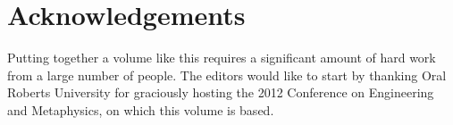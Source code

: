 \chapter*{Acknowledgements}

Putting together a volume like this requires a significant amount of hard work from a large number of people.  The editors would like to start by thanking Oral Roberts University for graciously hosting the 2012 Conference on Engineering and Metaphysics, on which this volume is based.  

